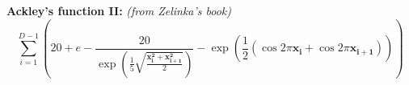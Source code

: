 \documentclass{minimal}
\begin{document}
\textbf{Ackley's function II:} \emph{(from Zelinka's book)}
\begin{equation}
\sum_{i=1}^{D-1}\left(20 + e - \frac{20}{\exp\left(\frac{1}{5}\sqrt{\frac{\mathbf{x_i^2} + \mathbf{x_{i+1}^2}}{2}}\right)} - \exp\left(\frac{1}{2}\left(\cos{2\pi \mathbf{x_i}} + \cos{2\pi \mathbf{x_{i+1}}}\right)\right)\right)
\end{equation}
\end{document}
